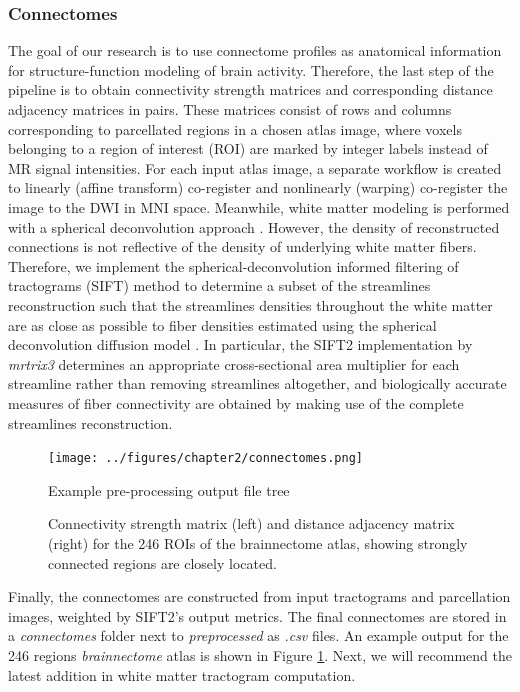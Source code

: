 \subsubsection{Connectomes}
The goal of our research is to use connectome profiles as anatomical information for structure-function modeling of brain activity. Therefore, the last step of the pipeline is to obtain connectivity strength matrices and corresponding distance adjacency matrices in pairs. These matrices consist of rows and columns corresponding to parcellated regions in a chosen atlas image, where voxels belonging to a region of interest (ROI) are marked by integer labels instead of MR signal intensities. For each input atlas image, a separate workflow is created to linearly (affine transform) co-register and nonlinearly (warping) co-register the image to the DWI in MNI space. Meanwhile, white matter modeling is performed with a spherical deconvolution approach \cite{jeurissen_multi-tissue_2014,tournier_direct_2004}. However, the density of reconstructed connections is not reflective of the density of underlying white matter fibers. Therefore, we implement the spherical-deconvolution informed filtering of tractograms (SIFT) method to determine a subset of the streamlines reconstruction such that the streamlines densities throughout the white matter are as close as possible to fiber densities estimated using the spherical deconvolution diffusion model \cite{smith_sift2_2015}. In particular, the SIFT2 implementation by \emph{mrtrix3} determines an appropriate cross-sectional area multiplier for each streamline rather than removing streamlines altogether, and biologically accurate measures of fiber connectivity are obtained by making use of the complete streamlines reconstruction. 

\begin{figure}[htbp]
    \centering
    \texttt{[image: ../figures/chapter2/connectomes.png]}
    \caption{Example pre-processing output file tree}
    \caption*{Connectivity strength matrix (left) and distance adjacency matrix (right) for the 246 ROIs of the brainnectome atlas, showing strongly connected regions are closely located.}
    \label{fig:omes}
\end{figure}

Finally, the connectomes are constructed from input tractograms and parcellation images, weighted by SIFT2's output metrics. The final connectomes are stored in a \emph{connectomes} folder next to \emph{preprocessed} as \emph{.csv} files. An example output for the 246 regions \emph{brainnectome} atlas \cite{fan_human_2016} is shown in Figure \ref{fig:omes}. Next, we will recommend the latest addition in white matter tractogram computation.

